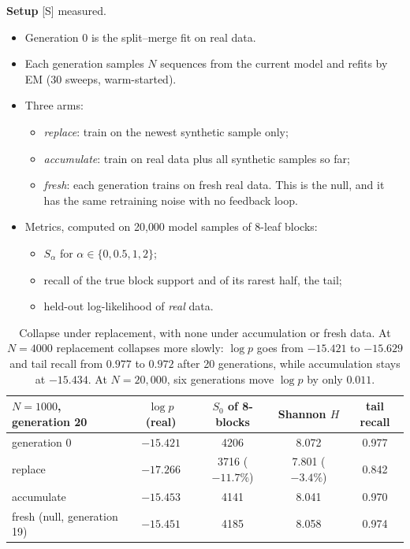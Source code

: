 \documentclass[11pt]{article}
\theoremstyle{definition}
\theoremstyle{remark}
\newcommand{\src}[1]{\textsf{\small[#1]}}
\newcommand{\st}[1]{\textsf{\small\color{gray}#1}}
\begin{document}
\textbf{Setup} \src{S} \st{measured}.
\begin{itemize}
  \item Generation 0 is the split--merge fit on real data.
  \item Each generation samples $N$ sequences from the current model and refits by EM (30 sweeps, warm-started).
  \item Three arms:
  \begin{itemize}
    \item \emph{replace}: train on the newest synthetic sample only;
    \item \emph{accumulate}: train on real data plus all synthetic samples so far;
    \item \emph{fresh}: each generation trains on fresh real data. This is the null, and it has the same retraining noise with no feedback loop.
  \end{itemize}
  \item Metrics, computed on 20{,}000 model samples of 8-leaf blocks:
  \begin{itemize}
    \item $S_\alpha$ for $\alpha\in\{0,0.5,1,2\}$;
    \item recall of the true block support and of its rarest half, the tail;
    \item held-out log-likelihood of \emph{real} data.
  \end{itemize}
\end{itemize}
\begin{table}[!htbp]\centering\small
\begin{tabular}{lcccc}
\toprule
$N=1000$, generation 20 & $\log p$ (real) & $S_0$ of 8-blocks & Shannon $H$ & tail recall\\
\midrule
generation 0 & $-15.421$ & 4206 & 8.072 & 0.977\\
replace & $-17.266$ & 3716 ($-11.7\%$) & 7.801 ($-3.4\%$) & 0.842\\
accumulate & $-15.453$ & 4141 & 8.041 & 0.970\\
fresh (null, generation 19) & $-15.451$ & 4185 & 8.058 & 0.974\\
\bottomrule
\end{tabular}
\caption{Collapse under replacement, with none under accumulation or fresh data. At $N=4000$ replacement collapses more slowly: $\log p$ goes from $-15.421$ to $-15.629$ and tail recall from $0.977$ to $0.972$ after 20 generations, while accumulation stays at $-15.434$. At $N=20{,}000$, six generations move $\log p$ by only $0.011$.}
\end{table}
\end{document}
